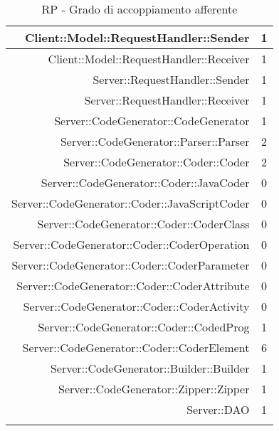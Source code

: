 \documentclass[../PianoDiQualifica.tex]{subfiles}
\begin{document}
\begin{longtable}{|r|c|}
				Client::Model::RequestHandler::Sender & 1 \\ \hline
				Client::Model::RequestHandler::Receiver & 1 \\ \hline
				Server::RequestHandler::Sender & 1 \\ \hline
				Server::RequestHandler::Receiver & 1 \\ \hline
				Server::CodeGenerator::CodeGenerator & 1 \\ \hline
				Server::CodeGenerator::Parser::Parser & 2 \\ \hline
				Server::CodeGenerator::Coder::Coder & 2 \\ \hline
				Server::CodeGenerator::Coder::JavaCoder & 0 \\ \hline
				Server::CodeGenerator::Coder::JavaScriptCoder & 0 \\ \hline
				Server::CodeGenerator::Coder::CoderClass & 0 \\ \hline
				Server::CodeGenerator::Coder::CoderOperation & 0 \\ \hline
				Server::CodeGenerator::Coder::CoderParameter & 0 \\ \hline
				Server::CodeGenerator::Coder::CoderAttribute & 0 \\ \hline
				Server::CodeGenerator::Coder::CoderActivity & 0 \\ \hline
				Server::CodeGenerator::Coder::CodedProg & 1 \\ \hline
				Server::CodeGenerator::Coder::CoderElement & 6 \\ \hline
				Server::CodeGenerator::Builder::Builder & 1 \\ \hline
				Server::CodeGenerator::Zipper::Zipper & 1 \\ \hline
				Server::DAO & 1 \\ \hline
				\caption{RP - Grado di accoppiamento afferente}
			\end{longtable}
\end{document}
